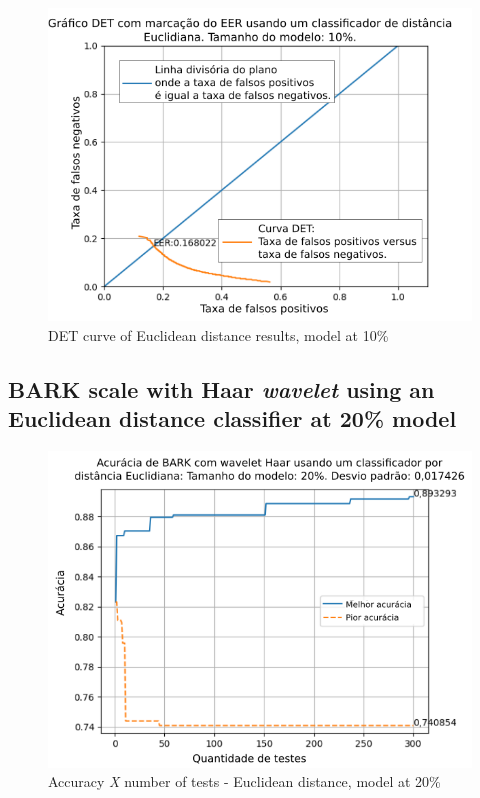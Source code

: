 \begin{figure}[!h]
	\centering
	\includegraphics[width=.9\linewidth]{images/results/det/DET_for_classifier_Euclidian_10}
	\caption{DET curve of Euclidean distance results, model at 10\% }
	\label{fig:detforclassifiereuclidian10}
\end{figure}

\subsection{BARK scale with Haar \textit{wavelet} using an Euclidean distance classifier at 20\% model}


\begin{figure}[ht]
	\centering
	\includegraphics[width=\linewidth]{images/results/confusionMatrices/classifier_Euclidian_20}
	\caption{Accuracy \textit {X} number of tests - Euclidean distance, model at 20\%}
	\label{fig:classifiereuclidian20}
\end{figure}

